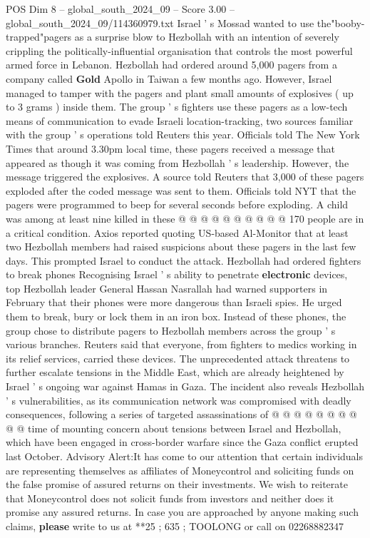 \begin{textsample}{POS Dim 8 – global\_south\_2024\_09 – Score 3.00 – global\_south\_2024\_09/114360979.txt}  \label{ex:f8_pos_287}
Israel ' s Mossad wanted to use the"booby-trapped"pagers as a surprise blow to Hezbollah with an intention of severely crippling the politically-influential organisation that controls the most powerful armed force in Lebanon.
Hezbollah had ordered around 5,000 pagers from a company called \textbf{Gold} Apollo in Taiwan a few months ago.
However, Israel managed to tamper with the pagers and plant small amounts of explosives ( up to 3 grams ) inside them.
The group ' s fighters use these pagers as a low-tech means of communication to evade Israeli location-tracking, two sources familiar with the group ' s operations told Reuters this year.
Officials told The New York Times that around 3.30pm local time, these pagers received a message that appeared as though it was coming from Hezbollah ' s leadership.
However, the message triggered the explosives.
A source told Reuters that 3,000 of these pagers exploded after the coded message was sent to them.
Officials told NYT that the pagers were programmed to beep for several seconds before exploding.
A child was among at least nine killed in these @ @ @ @ @ @ @ @ @ @ 170 people are in a critical condition.
Axios reported quoting US-based Al-Monitor that at least two Hezbollah members had raised suspicions about these pagers in the last few days.
This prompted Israel to conduct the attack.
Hezbollah had ordered fighters to break phones Recognising Israel ' s ability to penetrate \textbf{electronic} devices, top Hezbollah leader General Hassan Nasrallah had warned supporters in February that their phones were more dangerous than Israeli spies.
He urged them to break, bury or lock them in an iron box.
Instead of these phones, the group chose to distribute pagers to Hezbollah members across the group ' s various branches.
Reuters said that everyone, from fighters to medics working in its relief services, carried these devices.
The unprecedented attack threatens to further escalate tensions in the Middle East, which are already heightened by Israel ' s ongoing war against Hamas in Gaza.
The incident also reveals Hezbollah ' s vulnerabilities, as its communication network was compromised with deadly consequences, following a series of targeted assassinations of @ @ @ @ @ @ @ @ @ @ time of mounting concern about tensions between Israel and Hezbollah, which have been engaged in cross-border warfare since the Gaza conflict erupted last October.
Advisory Alert:It has come to our attention that certain individuals are representing themselves as affiliates of Moneycontrol and soliciting funds on the false promise of assured returns on their investments.
We wish to reiterate that Moneycontrol does not solicit funds from investors and neither does it promise any assured returns.
In case you are approached by anyone making such claims, \textbf{please} write to us at **25 ; 635 ; TOOLONG or call on 02268882347

\end{textsample}
